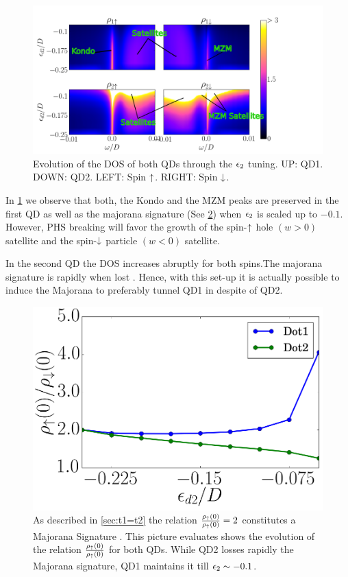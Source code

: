 \begin{figure}[h]
\centering
\includegraphics[scale=0.35]{IMAGES/ed2/2D.png}
\caption{\label{fig:2D/Shift_ed2} Evolution of the DOS of both QDs through the $\epsilon_{2}$ tuning. UP: QD1. DOWN: QD2. LEFT: Spin $\uparrow$. RIGHT: Spin $\downarrow$.}
\end{figure}


In \ref{fig:2D/Shift_ed2} we observe that both, the Kondo and the MZM peaks are preserved in the first QD as well as the majorana signature (See \ref{fig:ed2/Fermi}) when $\epsilon_{2}$ is scaled up to $-0.1$.  However,  PHS breaking will favor the growth of the spin-$\uparrow$ hole $(w>0)$  satellite and the spin-$\downarrow$ particle $(w<0)$ satellite.




In the second QD the DOS increases abruptly for both spins.The majorana signature is rapidly when  lost . Hence, with this set-up it is actually possible to induce the Majorana to preferably tunnel QD1 in despite of QD2.  \\
\begin{figure}[H]
\centering
\includegraphics[scale=0.3]{IMAGES/ed2/Fermi.png}
\caption{\label{fig:ed2/Fermi} As described in \ref{sec:t1=t2} the relation $\frac{\rho_\uparrow(0)}{\rho_\uparrow(0)}=2$ constitutes a Majorana Signature . This picture evaluates shows the evolution of the relation $\frac{\rho_\uparrow(0)}{\rho_\uparrow(0)}$ for both QDs. While QD2 losses rapidly the Majorana signature, QD1 maintains it till $\epsilon_{2}\sim -0.1$.}
\end{figure}


